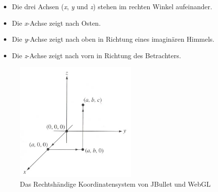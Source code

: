 \begin{itemize}
    \item Die drei Achsen (\textit{x}, \textit{y} und \textit{z}) stehen im rechten Winkel aufeinander.
    \item Die \textit{x}-Achse zeigt nach Osten.
    \item Die \textit{y}-Achse zeigt nach oben in Richtung eines imaginären Himmels.
    \item Die \textit{z}-Achse zeigt nach vorn in Richtung des Betrachters.
\end{itemize}
\begin{figure}
\centering
\includegraphics[height=60mm]{bilder/righthandcoordsystem.png}
\caption{Das Rechtshändige Koordinatensystem von JBullet und WebGL}
\label{fig:coordsystem}
\end{figure}